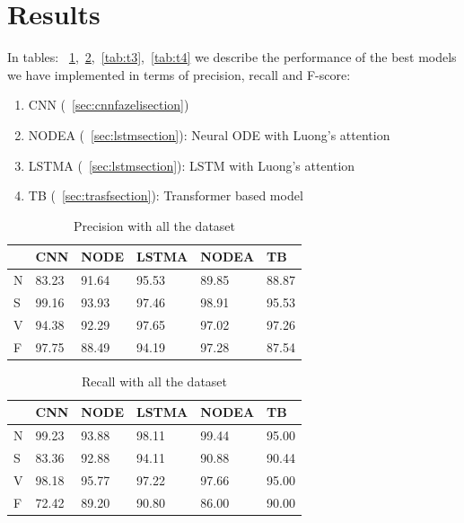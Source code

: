 \documentclass[LaM,binding=0.6cm]{sapthesis}
\begin{document}
\section{Results}
In tables: ~\ref{tab:t1},~\ref{tab:t2},~\ref{tab:t3},~\ref{tab:t4} we describe the performance of the best models we have implemented in terms of precision, recall and F-score:
\begin{enumerate}
\item CNN (~\ref{sec:cnnfazelisection})
\item NODEA (~\ref{sec:lstmsection}): Neural ODE with Luong's attention
\item LSTMA (~\ref{sec:lstmsection}): LSTM with Luong's attention
\item TB (~\ref{sec:trasfsection}): Transformer based model
\end{enumerate}

\begin{table}[H]
\centering
\begin{tabular}{l|l|l|l|l|l|}
\cline{2-6}
                        & CNN   & NODE & LSTMA & NODEA & TB\\ \hline
\multicolumn{1}{|l|}{N} & 83.23 & 91.64      & 95.53               & 89.85                      & 88.87            \\ \hline
\multicolumn{1}{|l|}{S} & 99.16 & 93.93      & 97.46               & 98.91                      & 95.53            \\ \hline
\multicolumn{1}{|l|}{V} & 94.38 & 92.29      & 97.65               & 97.02                      & 97.26            \\ \hline
\multicolumn{1}{|l|}{F} & 97.75 & 88.49      & 94.19               & 97.28                      & 87.54            \\ \hline
\end{tabular}
\caption{Precision with all the dataset}
\label{tab:t1}
\end{table}


\begin{table}[H]
\centering
\begin{tabular}{l|l|l|l|l|l|}
\cline{2-6}
                        & CNN   & NODE & LSTMA & NODEA & TB\\ \hline
\multicolumn{1}{|l|}{N} & 99.23 & 93.88      & 98.11               & 99.44                      & 95.00            \\ \hline
\multicolumn{1}{|l|}{S} & 83.36 & 92.88      & 94.11               & 90.88                      & 90.44            \\ \hline
\multicolumn{1}{|l|}{V} & 98.18 & 95.77      & 97.22               & 97.66                      & 95.00            \\ \hline
\multicolumn{1}{|l|}{F} & 72.42 & 89.20      & 90.80               & 86.00                      & 90.00            \\ \hline
\end{tabular}
\caption{Recall with all the dataset}
\label{tab:t2}
\end{table}
\end{document}
